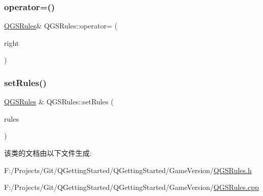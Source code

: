 \subsubsection{\texorpdfstring{operator=()}{operator=()}\hspace{0.1cm}{\footnotesize\ttfamily [2/2]}}
{\footnotesize\ttfamily \mbox{\hyperlink{class_q_g_s_rules}{Q\+G\+S\+Rules}}\& Q\+G\+S\+Rules\+::operator= (\begin{DoxyParamCaption}\item[{\mbox{\hyperlink{class_q_g_s_rules}{Q\+G\+S\+Rules}} \&\&}]{right }\end{DoxyParamCaption})\hspace{0.3cm}{\ttfamily [default]}}

\mbox{\label{class_q_g_s_rules_a7a241484b22485eef922021e2a51dc8b}} 
\subsubsection{\texorpdfstring{set\+Rules()}{setRules()}}
{\footnotesize\ttfamily \mbox{\hyperlink{class_q_g_s_rules}{Q\+G\+S\+Rules}} \& Q\+G\+S\+Rules\+::set\+Rules (\begin{DoxyParamCaption}\item[{const Q\+List$<$ \mbox{\hyperlink{class_q_g_s_rules_1_1_q_g_s_rule}{Q\+G\+S\+Rule}} $>$ \&}]{rules }\end{DoxyParamCaption})}



该类的文档由以下文件生成\+:\begin{DoxyCompactItemize}
\item 
F\+:/\+Projects/\+Git/\+Q\+Getting\+Started/\+Q\+Getting\+Started/\+Game\+Version/\mbox{\hyperlink{_q_g_s_rules_8h}{Q\+G\+S\+Rules.\+h}}\item 
F\+:/\+Projects/\+Git/\+Q\+Getting\+Started/\+Q\+Getting\+Started/\+Game\+Version/\mbox{\hyperlink{_q_g_s_rules_8cpp}{Q\+G\+S\+Rules.\+cpp}}\end{DoxyCompactItemize}

